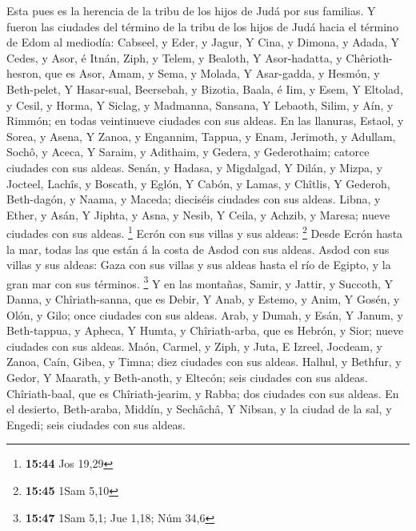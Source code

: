  Esta pues es la herencia de la tribu de los hijos de Judá
por sus familias.  Y fueron las ciudades del término de la
tribu de los hijos de Judá hacia el término de Edom al mediodía:
Cabseel, y Eder, y Jagur,  Y Cina, y Dimona, y Adada,
 Y Cedes, y Asor, é Itnán,  Ziph, y Telem, y
Bealoth,  Y Asor-hadatta, y Chêrioth-hesron, que es Asor,
 Amam, y Sema, y Molada,  Y Asar-gadda, y
Hesmón, y Beth-pelet,  Y Hasar-sual, Beersebah, y Bizotia,
 Baala, é Iim, y Esem,  Y Eltolad, y Cesil, y
Horma,  Y Siclag, y Madmanna, Sansana,  Y
Lebaoth, Silim, y Aín, y Rimmón; en todas veintinueve ciudades con sus
aldeas.  En las llanuras, Estaol, y Sorea, y Asena,
 Y Zanoa, y Engannim, Tappua, y Enam, 
Jerimoth, y Adullam, Sochô, y Aceca,  Y Saraim, y Adithaim,
y Gedera, y Gederothaim; catorce ciudades con sus aldeas. 
Senán, y Hadasa, y Migdalgad,  Y Dilán, y Mizpa, y Jocteel,
 Lachîs, y Boscath, y Eglón,  Y Cabón, y
Lamas, y Chîtlis,  Y Gederoh, Beth-dagón, y Naama, y
Maceda; dieciséis ciudades con sus aldeas.  Libna, y Ether,
y Asán,  Y Jiphta, y Asna, y Nesib,  Y Ceila,
y Achzib, y Maresa; nueve ciudades con sus aldeas. \footnote{\textbf{15:44}
  Jos 19,29}  Ecrón con sus villas y sus aldeas:
\footnote{\textbf{15:45} 1Sam 5,10}  Desde Ecrón hasta la
mar, todas las que están á la costa de Asdod con sus aldeas.
 Asdod con sus villas y sus aldeas: Gaza con sus villas y
sus aldeas hasta el río de Egipto, y la gran mar con sus términos.
\footnote{\textbf{15:47} 1Sam 5,1; Jue 1,18; Núm 34,6}  Y
en las montañas, Samir, y Jattir, y Succoth,  Y Danna, y
Chîriath-sanna, que es Debir,  Y Anab, y Estemo, y Anim,
 Y Gosén, y Olón, y Gilo; once ciudades con sus aldeas.
 Arab, y Dumah, y Esán,  Y Janum, y
Beth-tappua, y Apheca,  Y Humta, y Chîriath-arba, que es
Hebrón, y Sior; nueve ciudades con sus aldeas.  Maón,
Carmel, y Ziph, y Juta,  E Izreel, Jocdeam, y Zanoa,
 Caín, Gibea, y Timna; diez ciudades con sus aldeas.
 Halhul, y Bethfur, y Gedor,  Y Maarath, y
Beth-anoth, y Eltecón; seis ciudades con sus aldeas. 
Chîriath-baal, que es Chîriath-jearim, y Rabba; dos ciudades con sus
aldeas.  En el desierto, Beth-araba, Middín, y Sechâchâ,
 Y Nibsan, y la ciudad de la sal, y Engedi; seis ciudades
con sus aldeas.

